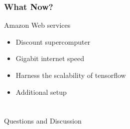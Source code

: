 \documentclass[pdf]{beamer}
\begin{document}
\begin{frame}
  \frametitle{What Now?}
  Amazon Web services
  \begin{itemize}
  \item Discount supercomputer
  \item Gigabit internet speed
  \item Harness the scalability of tensorflow
    \pause
  \item Additional setup
  \end{itemize}
\end{frame}

\section*{}
\begin{frame}
  \begin{center}
    \Large{Questions and Discussion}
  \end{center}
\end{frame}
\end{document}
